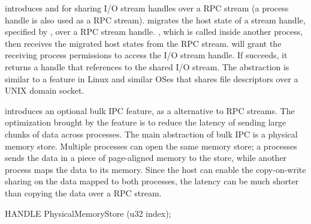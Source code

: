 \Thehostabi{} introduces  and  for sharing I/O stream handles over a RPC stream (a process handle is also used as a RPC stream).
migrates the host state of a stream handle, specified by ,
over a RPC stream handle.
,
which is called inside another process,
then receives the migrated host states from the RPC stream.
will grant the receiving process permissions to access the I/O stream handle. %
If  succeeds, it returns a handle
that references to the shared I/O stream.
The abstraction is similar to a feature in Linux and similar OSes that
shares file descriptors over a UNIX domain socket.






\Thehostabi{} introduces an optional bulk IPC feature, as a alternative to RPC streams.
The optimization brought
by the feature
is to reduce the latency of sending large chunks of data across processes.
The main abstraction of bulk IPC is a physical memory store.
Multiple processes can open the same memory store;
a processes sends the data in a piece of page-aligned memory to the store,
while another process maps the data to its memory.
Since the host can enable the copy-on-write sharing on the data mapped to both processes,
the latency can be much shorter than copying the data over a RPC stream.




\begin{paldef}
HANDLE PhysicalMemoryStore  (u32 index);
\end{paldef}


